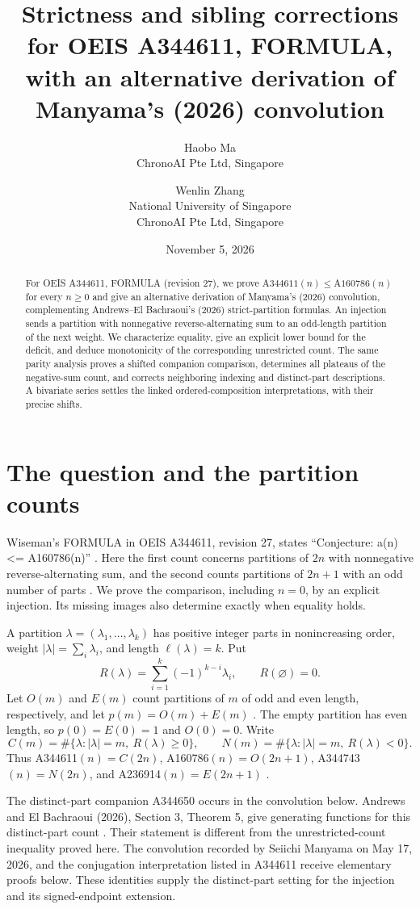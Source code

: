 \documentclass[11pt]{article}
\title{Strictness and sibling corrections for OEIS A344611, FORMULA,\protect\\
with an alternative derivation of Manyama's (2026) convolution}
\author{Haobo Ma\\\small ChronoAI Pte Ltd, Singapore
\and Wenlin Zhang\\\small National University of Singapore\\
\small ChronoAI Pte Ltd, Singapore}
\date{November 5, 2026}
\newcommand{\len}{\ell}
\begin{document}
\maketitle
\begin{abstract}
For OEIS A344611, FORMULA (revision 27), we prove
$\mathrm{A344611}(n)\le\allowbreak\mathrm{A160786}(n)$ for every $n\ge0$
and give an alternative derivation of Manyama's (2026) convolution,
complementing Andrews--El Bachraoui's (2026) strict-partition formulas.
An injection sends a partition with nonnegative
reverse-alternating sum to an odd-length partition of the next weight.
We characterize equality, give an explicit lower bound for the deficit,
and deduce monotonicity of the corresponding unrestricted count.
The same parity analysis proves a shifted companion comparison, determines
all plateaus of the negative-sum count, and corrects neighboring indexing
and distinct-part descriptions. A bivariate series settles the linked
ordered-composition interpretations, with their precise shifts.
\end{abstract}

\section{The question and the partition counts}
Wiseman's FORMULA in OEIS A344611, revision 27, states
``Conjecture: a(n) <= A160786(n)'' \cite{a344611}.
Here the first count concerns partitions of $2n$ with nonnegative
reverse-alternating sum, and the second counts partitions of $2n+1$
with an odd number of parts \cite{a160786,a027193}.
We prove the comparison, including $n=0$, by an explicit injection.
Its missing images also determine exactly when equality holds.

A partition $\lambda=(\lambda_1,\ldots,\lambda_k)$ has positive integer
parts in nonincreasing order, weight $|\lambda|=\sum_i\lambda_i$,
and length $\len(\lambda)=k$. Put
\[
 R(\lambda)=\sum_{i=1}^k(-1)^{k-i}\lambda_i,
 \qquad R(\varnothing)=0.
\]
Let $O(m)$ and $E(m)$ count partitions of $m$ of odd and even length,
respectively, and let $p(m)=O(m)+E(m)$ \cite{a027193,a027187,a000041}.
The empty partition has even
length, so $p(0)=E(0)=1$ and $O(0)=0$. Write
\[
 C(m)=\#\{\lambda:|\lambda|=m,\ R(\lambda)\ge0\},\qquad
 N(m)=\#\{\lambda:|\lambda|=m,\ R(\lambda)<0\}.
\]
Thus A344611$(n)=C(2n)$, A160786$(n)=O(2n+1)$,
A344743$(n)=N(2n)$, and A236914$(n)=E(2n+1)$
\cite{a344611,a160786,a344743,a236914}.

The distinct-part companion A344650 occurs in the convolution below.
Andrews and El Bachraoui (2026), Section 3, Theorem 5, give generating
functions for this distinct-part count \cite{andrews}.
Their statement is different from the unrestricted-count inequality
proved here. The convolution recorded by Seiichi Manyama on May 17, 2026,
and the conjugation interpretation listed in A344611 receive
elementary proofs below. These identities supply the distinct-part
setting for the injection and its signed-endpoint extension.
\end{document}
